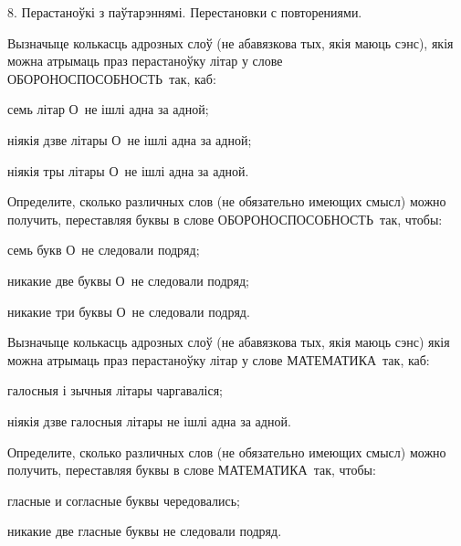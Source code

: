 



\biLangHeader
{8. Перастаноўкі з паўтарэннямі.}
{Перестановки с повторениями.}

\begin{problemList}

\problemItemSimple
{Вызначыце колькасць адрозных слоў (не абавязкова тых, якія маюць сэнс), якія можна атрымаць
праз перастаноўку літар у слове \guillemotleft ОБОРОНОСПОСОБНОСТЬ\guillemotright\ так, каб:
\begin{belarusianEnumerate}
  \item семь літар \guillemotleft О\guillemotright\ не ішлі адна за адной;
  \item ніякія дзве літары \guillemotleft О\guillemotright\ не ішлі адна за адной;
  \item ніякія тры літары \guillemotleft О\guillemotright\ не ішлі адна за адной.
\end{belarusianEnumerate}
}
{Определите, сколько различных слов (не обязательно имеющих смысл) можно
получить, переставляя буквы в слове \guillemotleft ОБОРОНОСПОСОБНОСТЬ\guillemotright\
так, чтобы:
\begin{russianEnumerate}
  \item семь букв \guillemotleft О\guillemotright\ не следовали подряд;
  \item никакие две буквы \guillemotleft О\guillemotright\ не следовали подряд;
  \item никакие три буквы \guillemotleft О\guillemotright\ не следовали подряд.
\end{russianEnumerate}}

\bigskip

\problemItemSimple
{Вызначыце колькасць адрозных слоў (не абавязкова тых, якія маюць сэнс) якія можна атрымаць
праз перастаноўку літар у слове \guillemotleft МАТЕМАТИКА\guillemotright\ так, каб:
\begin{belarusianEnumerate}
  \item галосныя і зычныя літары чаргаваліся;
  \item ніякія дзве галосныя літары не ішлі адна за адной.
\end{belarusianEnumerate}
}
{Определите, сколько различных слов (не обязательно имеющих смысл) можно
получить, переставляя буквы в слове \guillemotleft МАТЕМАТИКА\guillemotright\
так, чтобы:
\begin{russianEnumerate}
  \item гласные и согласные буквы чередовались;
  \item никакие две гласные буквы не следовали подряд.
\end{russianEnumerate}}


\end{problemList}
